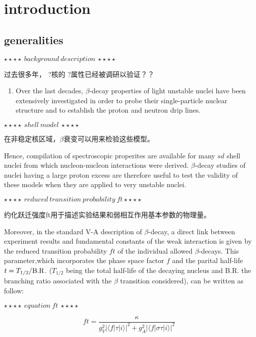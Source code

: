 \documentclass[UTF8]{ctexart}
\begin{document}
\section{introduction}
\subsection{generalities}
$\star\star\star\star ~background~description~ \star\star\star\star$

过去很多年， {\color{red}?}核的 {\color{red}?}属性已经被调研以验证？？
\begin{enumerate}
    \item Over the last decades, $\beta$-decay properties of light unstable nuclei have been extensively investigated in order to probe their single-particle nuclear structure and to establish the proton and neutron drip lines.
\end{enumerate}

$\star\star\star\star ~shell ~model~  \star\star\star\star$

在非稳定核区域，$\beta$衰变可以用来检验这些模型。

Hence, compilation of spectroscopic properites are available for many $sd$ shell nuclei from which nucleon-nucleon interactions were derived. $\beta$-decay studies of nuclei having a large proton excess are therefore useful to test the validity of these models when they are applied to very unstable nuclei.

$\star\star\star\star ~reduced ~transition ~probability ~ft \star\star\star\star$

约化跃迁强度ft用于描述实验结果和弱相互作用基本参数的物理量。

Moreover, in the standard V-A description of $\beta$-decay, a direct link between experiment results and fundamental constants of the weak interaction is given by the reduced transition probability $ft$ of the individual allowed $\beta$-decays. This parameter,which incorporates the phase space factor $f$ and the parital half-life $t=T_{1/2}/\rm{B.R}$. ($T_{1/2}$ being the total half-life of the decaying nucleus and B.R. the branching ratio associated with the $\beta$ transition considered), can be written as follow:

$\star\star\star\star~equation~ft~\star\star\star\star$

\begin{equation}
    ft=\frac{\kappa}{g^{2}_{V}\Big|\langle f|\tau|i \rangle\Big|^{2}+g^{2}_{A}\Big|\langle f|\sigma\tau|i \rangle\Big|^{2}}
\end{equation}
\end{document}
